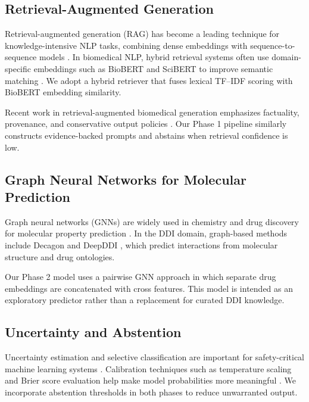 \documentclass[conference]{IEEEtran}
\begin{document}
\subsection{Retrieval-Augmented Generation}
Retrieval-augmented generation (RAG) has become a leading technique for knowledge-intensive NLP tasks, combining dense embeddings with sequence-to-sequence models \cite{lewis2020retrieval, izacard2020leveraging}. In biomedical NLP, hybrid retrieval systems often use domain-specific embeddings such as BioBERT and SciBERT to improve semantic matching \cite{lee2020biobert, beltagy2019scibert}. We adopt a hybrid retriever that fuses lexical TF--IDF scoring with BioBERT embedding similarity.

Recent work in retrieval-augmented biomedical generation emphasizes factuality, provenance, and conservative output policies \cite{gupta2023retrieval, perez2022red}. Our Phase 1 pipeline similarly constructs evidence-backed prompts and abstains when retrieval confidence is low.

\subsection{Graph Neural Networks for Molecular Prediction}
Graph neural networks (GNNs) are widely used in chemistry and drug discovery for molecular property prediction \cite{gilmer2017neural, wu2018moleculenet, yin2021moleculenet}. In the DDI domain, graph-based methods include Decagon \cite{zitnik2018decagon} and DeepDDI \cite{zhao2021deepddi}, which predict interactions from molecular structure and drug ontologies.

Our Phase 2 model uses a pairwise GNN approach in which separate drug embeddings are concatenated with cross features. This model is intended as an exploratory predictor rather than a replacement for curated DDI knowledge.

\subsection{Uncertainty and Abstention}
Uncertainty estimation and selective classification are important for safety-critical machine learning systems \cite{el2010foundations, geifman2017selective}. Calibration techniques such as temperature scaling and Brier score evaluation help make model probabilities more meaningful \cite{guo2017calibration, nobel2020calibration}. We incorporate abstention thresholds in both phases to reduce unwarranted output.
\end{document}

